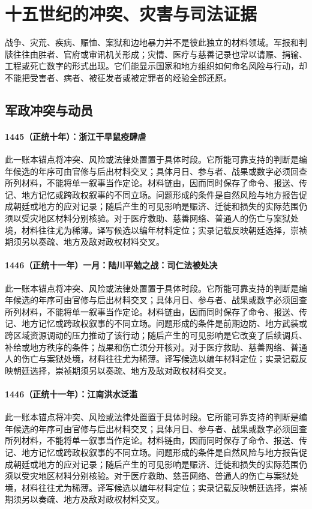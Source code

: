 \section{十五世纪的冲突、灾害与司法证据}

战争、灾荒、疾病、赈恤、案狱和边地暴力并不是彼此独立的材料领域。军报和判牍往往由胜者、官府或审讯机关形成；灾情、医疗与慈善记录也常以请赈、捐输、工程或死亡数字的形式出现。它们能显示国家和地方组织如何命名风险与行动，却不能把受害者、病者、被征发者或被定罪者的经验全部还原。

\subsection{军政冲突与动员}

\paragraph{1445（正统十年）：浙江干旱鼠疫肆虐} 此一账本锚点将冲突、风险或法律处置置于具体时段。它所能可靠支持的判断是编年候选的年序可由官修与后出材料交叉；具体月日、参与者、战果或数字必须回查所列材料，不能将单一叙事当作定论。材料链由，因而同时保存了命令、报送、传记、地方记忆或跨政权叙事的不同立场。问题形成的条件是自然风险与地方报告促成朝廷或地方的应对记录；随后产生的可见影响是赈济、迁徙和损失的实际范围仍须以受灾地区材料分别核验。对于医疗救助、慈善网络、普通人的伤亡与案狱处境，材料往往尤为稀薄。译写候选以编年材料定位；实录记载反映朝廷选择，崇祯期须另以奏疏、地方及敌对政权材料交叉。

\paragraph{1446（正统十一年）一月：陆川平勉之战：司仁法被处决} 此一账本锚点将冲突、风险或法律处置置于具体时段。它所能可靠支持的判断是编年候选的年序可由官修与后出材料交叉；具体月日、参与者、战果或数字必须回查所列材料，不能将单一叙事当作定论。材料链由，因而同时保存了命令、报送、传记、地方记忆或跨政权叙事的不同立场。问题形成的条件是前期边防、地方武装或跨区域资源调动的压力推动了该行动；随后产生的可见影响是它改变了后续调兵、补给或地方秩序的条件；战果和伤亡须分开核对。对于医疗救助、慈善网络、普通人的伤亡与案狱处境，材料往往尤为稀薄。译写候选以编年材料定位；实录记载反映朝廷选择，崇祯期须另以奏疏、地方及敌对政权材料交叉。

\paragraph{1446（正统十一年）：江南洪水泛滥} 此一账本锚点将冲突、风险或法律处置置于具体时段。它所能可靠支持的判断是编年候选的年序可由官修与后出材料交叉；具体月日、参与者、战果或数字必须回查所列材料，不能将单一叙事当作定论。材料链由，因而同时保存了命令、报送、传记、地方记忆或跨政权叙事的不同立场。问题形成的条件是自然风险与地方报告促成朝廷或地方的应对记录；随后产生的可见影响是赈济、迁徙和损失的实际范围仍须以受灾地区材料分别核验。对于医疗救助、慈善网络、普通人的伤亡与案狱处境，材料往往尤为稀薄。译写候选以编年材料定位；实录记载反映朝廷选择，崇祯期须另以奏疏、地方及敌对政权材料交叉。

